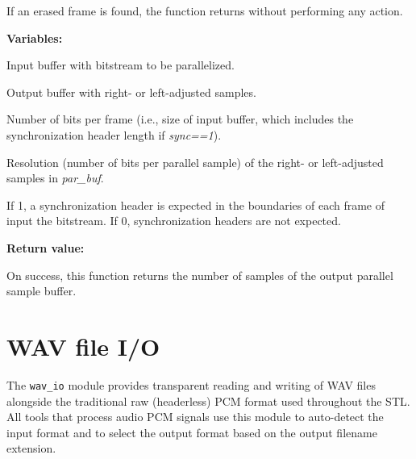 If an erased frame is found, the function returns without performing
any action.

{\bf Variables: }
\begin{Descr}{\DescrLen}
\item[\pbox{20mm}{\em bit\_stm}] %
                    Input buffer with bitstream to be parallelized.

\item[\pbox{20mm}{\em par\_buf}] %
                    Output buffer with right- or left-adjusted samples.

\item[\pbox{20mm}{\em bs\_len}] %
                    Number of bits per frame (i.e., size of input buffer,
                    which includes the synchronization header length
                    if {\em sync==1}).

\item[\pbox{20mm}{\em resol}] %
                    Resolution (number of bits per parallel sample) of
                    the right- or left-adjusted samples in {\em par\_buf}.

\item[\pbox{20mm}{\em sync}] %
                    If 1, a synchronization header is expected in the
                    boundaries of each frame of input the bitstream.
                    If 0, synchronization headers are not expected.
\end{Descr}

{\bf Return value: }

On success, this function returns the number of samples of the output
parallel sample buffer.


\section{WAV file I/O} \label{Utl-wav-io}

The {\tt wav\_io} module provides transparent reading and writing of WAV
files alongside the traditional raw (headerless) PCM format used throughout
the STL. All tools that process audio PCM signals use this module to
auto-detect the input format and to select the output format based on the
output filename extension.

